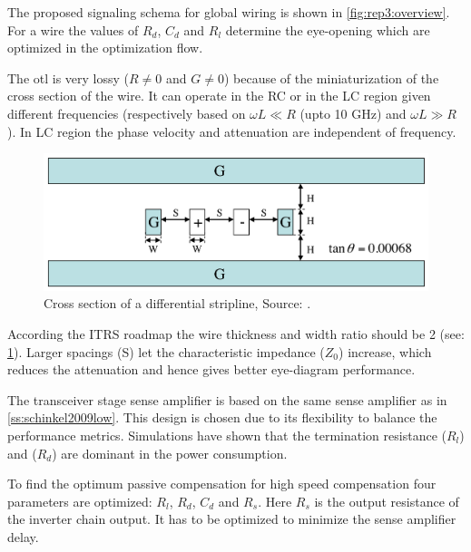 \summary
The proposed signaling schema for global wiring is shown in \cref{fig:rep3:overview}.
For a wire the values of $R_{d}$, $C_{d}$ and $R_{l}$ determine the eye-opening which are optimized in the optimization flow.

The \ac{otl} is very lossy ($R \neq 0$ and $G \neq 0$) because of the miniaturization of the cross section of the wire.
It can operate in the RC or in the LC region given different frequencies (respectively based on $\omega L \ll R$ (upto 10 GHz) and $\omega L \gg R$).
In LC region the phase velocity and attenuation are independent of frequency.

\begin{figure}	\centering
	
	\includegraphics[width=0.95\linewidth]{Figures/Rep3TransmissionLine.png}
	\caption{Cross section of a differential stripline, Source: \cite{zhang2009high}.} 
    \label{fig:rep3:crosssection}
\end{figure}
According the ITRS roadmap the wire thickness and width ratio should be 2 (see: \cref{fig:rep3:crosssection}).
Larger spacings (S) let the characteristic impedance ($Z_{0}$) increase, which reduces the attenuation and hence gives better eye-diagram performance. %

The transceiver stage sense amplifier is based on the same sense amplifier as in \cref{ss:schinkel2009low}.
This design is chosen due to its flexibility to balance the performance metrics.
Simulations have shown that the termination resistance ($R_{l}$) and ($R_{d}$) are dominant in the power consumption.

To find the optimum passive compensation for high speed compensation four parameters are optimized: $R_{l}$, $R_{d}$, $C_{d}$ and $R_{s}$.
Here $R_{s}$ is the output resistance of the inverter chain output.
It has to be optimized to minimize the sense amplifier delay.

